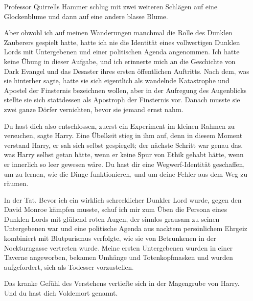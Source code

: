 Professor Quirrells Hammer schlug mit zwei weiteren Schlägen auf eine
Glockenblume und dann auf eine andere blasse Blume.

\glqq{}Aber obwohl ich auf meinen Wanderungen manchmal die Rolle des Dunklen
Zauberers gespielt hatte, hatte ich nie die Identität eines vollwertigen Dunklen
Lords mit Untergebenen und einer politischen Agenda angenommen. Ich hatte keine
Übung in dieser Aufgabe, und ich erinnerte mich an die Geschichte von Dark
Evangel und das Desaster ihres ersten öffentlichen Auftritts. Nach dem, was sie
hinterher sagte, hatte sie sich eigentlich als wandelnde Katastrophe und Apostel
der Finsternis bezeichnen wollen, aber in der Aufregung des Augenblicks stellte
sie sich stattdessen als Apostroph der Finsternis vor. Danach musste sie zwei
ganze Dörfer vernichten, bevor sie jemand ernst nahm.\grqq{}

\glqq{}Du hast dich also entschlossen, zuerst ein Experiment im kleinen Rahmen zu
versuchen\grqq{}, sagte Harry. Eine Übelkeit stieg in ihm auf, denn in diesem
Moment verstand Harry, er sah sich selbst gespiegelt; der nächste Schritt war
genau das, was Harry selbst getan hätte, wenn er keine Spur von Ethik gehabt
hätte, wenn er innerlich so leer gewesen wäre. \glqq{}Du hast dir eine
Wegwerf-Identität geschaffen, um zu lernen, wie die Dinge funktionieren, und um
deine Fehler aus dem Weg zu räumen.\grqq{}

\glqq{}In der Tat. Bevor ich ein wirklich schrecklicher Dunkler Lord wurde, gegen
den David Monroe kämpfen musste, schuf ich mir zum Üben die Persona eines
Dunklen Lords mit glühend roten Augen, der sinnlos grausam zu seinen
Untergebenen war und eine politische Agenda aus nacktem persönlichem Ehrgeiz
kombiniert mit Blutpurismus verfolgte, wie sie von Betrunkenen in der
Nockturngasse vertreten wurde. Meine ersten Untergebenen wurden in einer Taverne
angeworben, bekamen Umhänge und Totenkopfmasken und wurden aufgefordert, sich
als Todesser vorzustellen.\grqq{}

Das kranke Gefühl des Verstehens vertiefte sich in der Magengrube von Harry.
\glqq{}Und du hast dich Voldemort genannt.\grqq{}

